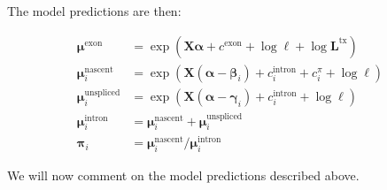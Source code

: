 \documentclass[11pt]{article}
\begin{document}
	The model predictions are then:
	\begin{tcolorbox}[
		colback=white, colframe=black, boxrule=0.4pt, arc=1pt,
		title=Model predictions, fonttitle=\bfseries\small,
		coltitle=black, colbacktitle=white,
		left=6pt, right=6pt, top=4pt, bottom=4pt,
		]
		\begin{subequations}
		\begin{align}
			\boldsymbol{\mu}^{\mathrm{exon}} &= \exp \left( \boldsymbol{X} \boldsymbol{\alpha} + c^{\mathrm{exon}} + \log \boldsymbol{\ell} + \log \boldsymbol{L}^{\mathrm{tx}} \right) \label{eq:pred_mu_exon}\\
			\boldsymbol{\mu}^{\mathrm{nascent}}_{i} &= \exp \left( \boldsymbol{X} (\boldsymbol{\alpha} - \boldsymbol{\beta}_i) + c^{\mathrm{intron}}_{i} + c^{\pi}_{i} + \log \boldsymbol{\ell} \right) \label{eq:pred_mu_nascent}\\
			\boldsymbol{\mu}^{\mathrm{unspliced}}_{i} &= \exp \left( \boldsymbol{X} (\boldsymbol{\alpha} - \boldsymbol{\gamma}_i) + c^{\mathrm{intron}}_{i} + \log \boldsymbol{\ell} \right) \label{eq:pred_mu_unspliced}\\
			\boldsymbol{\mu}^{\mathrm{intron}}_{i} &= \boldsymbol{\mu}^{\mathrm{nascent}}_{i} + \boldsymbol{\mu}^{\mathrm{unspliced}}_{i} \label{eq:pred_mu_intron}\\
			\boldsymbol{\pi}_{i} &= \boldsymbol{\mu}^{\mathrm{nascent}}_{i} / \boldsymbol{\mu}^{\mathrm{intron}}_{i} \label{eq:pred_pi}
		\end{align}
		\end{subequations}
	\end{tcolorbox}
	We will now comment on the model predictions described above.
\end{document}
